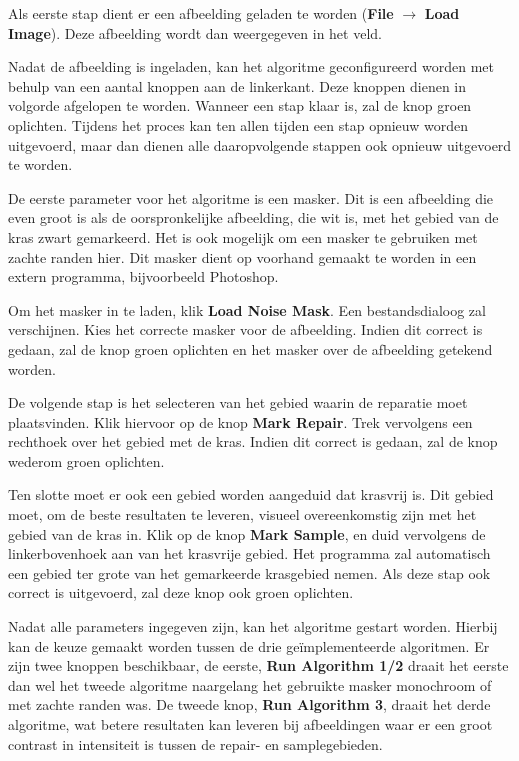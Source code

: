 \documentclass[a4paper,12pt]{article}
\begin{document}
Als eerste stap dient er een afbeelding geladen te worden 
(\textbf{File} $\to$ \textbf{Load Image}). Deze afbeelding wordt dan
weergegeven in het veld.

Nadat de afbeelding is ingeladen, kan het algoritme geconfigureerd worden met
behulp van een aantal knoppen aan de linkerkant. Deze knoppen dienen in
volgorde afgelopen te worden. Wanneer een stap klaar is, zal de knop groen
oplichten. Tijdens het proces kan ten allen tijden een stap opnieuw worden
uitgevoerd, maar dan dienen alle daaropvolgende stappen ook opnieuw uitgevoerd
te worden.

De eerste parameter voor het algoritme is een masker. Dit is een afbeelding die
even groot is als de oorspronkelijke afbeelding, die wit is, met het gebied van
de kras zwart gemarkeerd. Het is ook mogelijk om een masker te gebruiken met
zachte randen hier. Dit masker dient op voorhand gemaakt te worden in een
extern programma, bijvoorbeeld Photoshop.

Om het masker in te laden, klik \textbf{Load Noise Mask}. Een bestandsdialoog
zal verschijnen. Kies het correcte masker voor de afbeelding. Indien dit
correct is gedaan, zal de knop groen oplichten en het masker over de afbeelding
getekend worden. 

De volgende stap is het selecteren van het gebied waarin de reparatie moet
plaatsvinden. Klik hiervoor op de knop \textbf{Mark Repair}. Trek vervolgens
een rechthoek over het gebied met de kras. Indien dit correct is gedaan, zal de
knop wederom groen oplichten.

Ten slotte moet er ook een gebied worden aangeduid dat krasvrij is. Dit gebied
moet, om de beste resultaten te leveren, visueel overeenkomstig zijn met het
gebied van de kras in. Klik op de knop \textbf{Mark Sample}, en duid vervolgens
de linkerbovenhoek aan van het krasvrije gebied. Het programma zal automatisch
een gebied ter grote van het gemarkeerde krasgebied nemen. Als deze stap ook
correct is uitgevoerd, zal deze knop ook groen oplichten.

Nadat alle parameters ingegeven zijn, kan het algoritme gestart worden.
Hierbij kan de keuze gemaakt worden tussen de drie ge\"implementeerde
algoritmen. Er zijn twee knoppen beschikbaar, de eerste, 
\textbf{Run Algorithm 1/2} draait het eerste dan wel het tweede algoritme
naargelang het gebruikte masker monochroom of met zachte randen was. De tweede
knop, \textbf{Run Algorithm 3}, draait het derde algoritme, wat betere
resultaten kan leveren bij afbeeldingen waar er een groot contrast in
intensiteit is tussen de repair- en samplegebieden.
\end{document}
